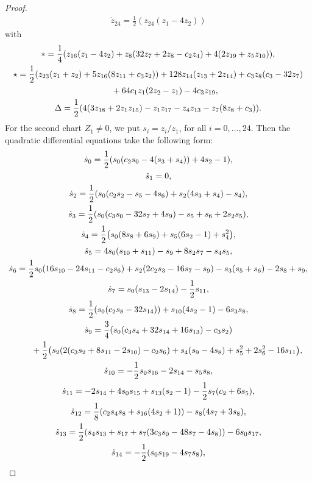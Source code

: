 \documentclass[10pt,a4paper]{amsart}
\numberwithin{equation}{section}
\begin{document}
\begin{proof}
\begin{gather*}
 \dot{z}_{24}= \frac{1}{2}(z_{24}(z_1-4z_2))
\end{gather*}
with
\begin{gather*}
 \ast=\frac{1}{4}(z_{16}(z_1-4z_2)+z_8(32z_7+2z_8-c_2z_4)+4(2z_{19}+z_5z_{10})), \\
 \star=\frac{1}{2}(z_{23}(z_1+z_2)+5z_{16}(8z_{11}+c_3z_2))+128z_{14}(z_{13}+2z_{14})+c_3z_8(c_3-32z_7)\\ \hphantom{\star=}{}
 +64c_1z_1(2z_2-z_1)-4c_3z_{19},\\
 \Delta =\frac{1}{2}(4(3z_{18}+2z_1z_{15})-z_1z_{17}-z_4z_{13}-z_7(8z_8+c_3)).
\end{gather*}
 For the second chart $Z_1\neq0$, we put $s_i=z_i/z_1$, for
all $i=0,\dots,24$. Then the quadratic differential equations take
the following form:
\begin{gather*}
 \dot{s}_0= \frac{1}{2}(s_0(c_2s_0-4(s_3+s_4))+4s_2-1) , \\
 \dot{s}_1= 0 , \\
 \dot{s}_2= \frac{1}{2}(s_0(c_2s_2-s_5-4s_6)+s_2(4s_3+s_4)-s_4) , \\
 \dot{s}_3= \frac{1}{2}(s_0(c_3s_0-32s_7+4s_9)-s_5+s_6+2s_2s_5) , \\
 \dot{s}_4= \frac{1}{2}\bigl(s_0(8s_8+6s_9)+s_5(6s_2-1)+s_4^2\bigr), \\
 \dot{s}_5= 4s_0(s_{10}+s_{11})-s_9+8s_2s_7-s_4s_5 , \\
 \dot{s}_6= \frac{1}{2}s_0(16s_{10}-24s_{11}-c_2s_6)+s_2(2c_2s_3-16s_7-s_9)-s_3(s_5+s_6)-2s_8+s_9 , \\
 \dot{s}_7= s_0(s_{13}-2s_{14})-\frac{1}{2}s_{11} , \\
 \dot{s}_8= \frac{1}{2}(s_0(c_2s_8-32s_{14}))+s_{10}(4s_2-1)-6s_3s_8, \\
 \dot{s}_9= \frac{3}{4}(s_0(c_3s_4+32s_{14}+16s_{13})-c_3s_2) \\ \hphantom{\dot{s_9}=}{}
 +\frac{1}{2}\bigl(s_2(2(c_3s_2+8s_{11}-2s_{10})-c_2s_6) +s_4(s_9-4s_8)+s_5^2+2s_6^2-16s_{11}\bigr), \\
 \dot{s}_{10}= -\frac{1}{2}s_0s_{16}-2s_{14}-s_5s_8 , \\
 \dot{s}_{11}= -2s_{14}+4s_0s_{15}+s_{13}(s_2-1)-\frac{1}{2}s_7(c_2+6s_5) , \\
 \dot{s}_{12}=\frac{1}{8}(c_2s_4s_8+s_{16}(4s_2+1))-s_8(4s_7+3s_8), \\
 \dot{s}_{13}= \frac{1}{2}(s_4s_{13}+s_{17}+s_7(3c_3s_0-48s_7-4s_8))-6s_0s_{17} , \\
 \dot{s}_{14}= -\frac{1}{2}(s_0s_{19}-4s_7s_8), \\

\end{gather*}
\end{proof}
\end{document}

